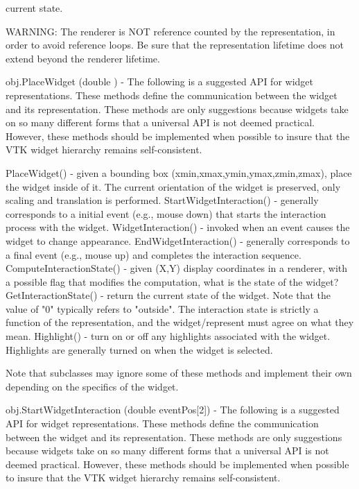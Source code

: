 \begin{DoxyItemize}
\begin{DoxyPre}
                         current state.
 \end{DoxyPre}
 W\-A\-R\-N\-I\-N\-G\-: The renderer is N\-O\-T reference counted by the representation, in order to avoid reference loops. Be sure that the representation lifetime does not extend beyond the renderer lifetime.  
\item {\ttfamily obj.\-Place\-Widget (double )} -\/ The following is a suggested A\-P\-I for widget representations. These methods define the communication between the widget and its representation. These methods are only suggestions because widgets take on so many different forms that a universal A\-P\-I is not deemed practical. However, these methods should be implemented when possible to insure that the V\-T\-K widget hierarchy remains self-\/consistent. 
\begin{DoxyPre}
 PlaceWidget() - given a bounding box (xmin,xmax,ymin,ymax,zmin,zmax), place 
                 the widget inside of it. The current orientation of the widget 
                 is preserved, only scaling and translation is performed.
 StartWidgetInteraction() - generally corresponds to a initial event (e.g.,
                            mouse down) that starts the interaction process
                            with the widget.
 WidgetInteraction() - invoked when an event causes the widget to change 
                       appearance.
 EndWidgetInteraction() - generally corresponds to a final event (e.g., mouse up)
                          and completes the interaction sequence.
 ComputeInteractionState() - given (X,Y) display coordinates in a renderer, with a
                             possible flag that modifies the computation,
                             what is the state of the widget?
 GetInteractionState() - return the current state of the widget. Note that the
                         value of "0" typically refers to "outside". The 
                         interaction state is strictly a function of the
                         representation, and the widget/represent must agree
                         on what they mean.
 Highlight() - turn on or off any highlights associated with the widget.
               Highlights are generally turned on when the widget is selected.
 \end{DoxyPre}
 Note that subclasses may ignore some of these methods and implement their own depending on the specifics of the widget.  
\item {\ttfamily obj.\-Start\-Widget\-Interaction (double event\-Pos\mbox{[}2\mbox{]})} -\/ The following is a suggested A\-P\-I for widget representations. These methods define the communication between the widget and its representation. These methods are only suggestions because widgets take on so many different forms that a universal A\-P\-I is not deemed practical. However, these methods should be implemented when possible to insure that the V\-T\-K widget hierarchy remains self-\/consistent. 

\end{DoxyItemize}
